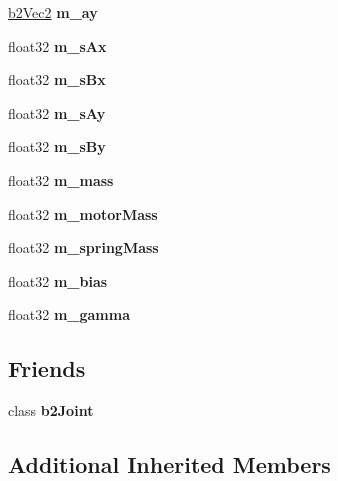 \begin{DoxyCompactItemize}
\mbox{\hyperlink{structb2Vec2}{b2\+Vec2}} {\bfseries m\+\_\+ay}
\item 
\mbox{\label{classb2WheelJoint_a0935bcd6aea2145f6c8e947159a1e59b}} 
float32 {\bfseries m\+\_\+s\+Ax}
\item 
\mbox{\label{classb2WheelJoint_a0705a4e0dfd40bf25f518bb22d6e0177}} 
float32 {\bfseries m\+\_\+s\+Bx}
\item 
\mbox{\label{classb2WheelJoint_aaeb83f256ec67556cc1d7758f75b773e}} 
float32 {\bfseries m\+\_\+s\+Ay}
\item 
\mbox{\label{classb2WheelJoint_a4fa320609b2942eee344ac0d91003444}} 
float32 {\bfseries m\+\_\+s\+By}
\item 
\mbox{\label{classb2WheelJoint_a80abc7c0fe5a4d6f362ec5cb13214ec1}} 
float32 {\bfseries m\+\_\+mass}
\item 
\mbox{\label{classb2WheelJoint_a64d20e079b2638995c7faa5d3a2aed68}} 
float32 {\bfseries m\+\_\+motor\+Mass}
\item 
\mbox{\label{classb2WheelJoint_ab24b6e3ad48961de7d78e4476531dd30}} 
float32 {\bfseries m\+\_\+spring\+Mass}
\item 
\mbox{\label{classb2WheelJoint_a82bec93fb4a2a3702455bede3d5c6ac8}} 
float32 {\bfseries m\+\_\+bias}
\item 
\mbox{\label{classb2WheelJoint_a3d4c8b3e96b517d13693285e63a917fb}} 
float32 {\bfseries m\+\_\+gamma}
\end{DoxyCompactItemize}
\subsection*{Friends}
\begin{DoxyCompactItemize}
\item 
\mbox{\label{classb2WheelJoint_a54ade8ed3d794298108d7f4c4e4793fa}} 
class {\bfseries b2\+Joint}
\end{DoxyCompactItemize}
\subsection*{Additional Inherited Members}


